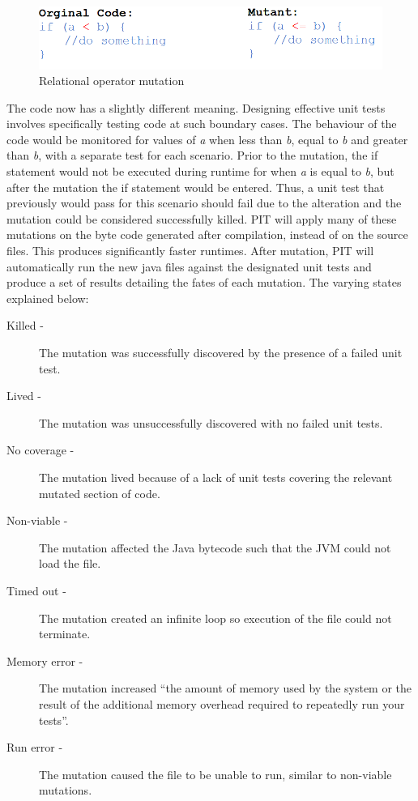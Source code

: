 \documentclass[a4paper,12pt]{article}
\begin{document}
\begin{figure}[h]
    \includegraphics[scale = 0.65]{mutation.png}
    \caption{Relational operator mutation}
    \label{fig:mutation}
\end{figure}
    
The code now has a slightly different meaning. Designing effective unit tests involves specifically testing code at such boundary cases. The behaviour of the code would be monitored for values of \textit{a} when less than \textit{b}, equal to \textit{b} and greater than \textit{b}, with a separate test for each scenario. Prior to the mutation, the if statement would not be executed during runtime for when \textit{a} is equal to \textit{b}, but after the mutation the if statement would be entered. Thus, a unit test that previously would pass for this scenario should fail due to the alteration and the mutation could be considered successfully killed. PIT will apply many of these mutations on the byte code generated after compilation, instead of on the source files. This produces significantly faster runtimes. After mutation, PIT will automatically run the new java files against the designated unit tests and produce a set of results detailing the fates of each mutation. The varying states explained below:

\begin{description}
    \item[Killed - ]The mutation was successfully discovered by the presence of a failed unit test.
    \item[Lived -]The mutation was unsuccessfully discovered with no failed unit tests. 
    \item[No coverage -]The mutation lived because of a lack of unit tests covering the relevant mutated section of code. 
    \item[Non-viable -]The mutation affected the Java bytecode such that the JVM could not load the file.
    \item[Timed out -]The mutation created an infinite loop so execution of the file could not terminate. 
    \item[Memory error -]The mutation increased “the amount of memory used by the system or the result of the additional memory overhead required to repeatedly run your tests”.
    \item[Run error -]The mutation caused the file to be unable to run, similar to non-viable mutations. \citep{pit19}
\end{description}
\end{document}
